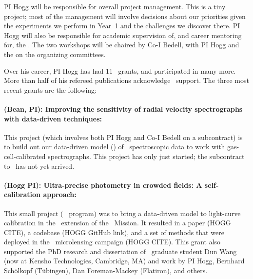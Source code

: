 \documentclass[12pt, letterpaper]{article}
\begin{document}
PI Hogg will be responsible for overall project management. This is a
tiny project; most of the management will involve decisions about our
priorities given the experiments we perform in Year~1 and the
challenges we discover there.
PI Hogg will also be responsible for academic supervision of, and
career mentoring for, the \GRA.
The two workshops will be chaired by Co-I Bedell, with PI Hogg and
the \GRA on the organizing committees.


Over his career, PI Hogg has had 11 \NASA\ grants, and participated in
many more.
More than half of his refereed publications acknowledge \NASA\ support.
The three most recent grants are the following:

\paragraph{ (Bean, PI):
Improving the sensitivity of radial velocity spectrographs with data-driven techniques:}
This project (which involves both PI Hogg and Co-I Bedell on a subcontract)
is to
build out our data-driven model (\wobble) of \EPRV\ spectroscopic data
to work with gas-cell-calibrated spectrographs. This project has only
just started; the subcontract to \NYU\ has not yet arrived.

\paragraph{ (Hogg PI):
Ultra-precise photometry in crowded fields: A self-calibration approach:}
This small project (\Ktwo\  program)
was to bring a data-driven model to light-curve calibration
in the \Ktwo\ extension of the \Kepler\ Mission.
It resulted in a paper (HOGG CITE), a codebase (HOGG GitHub link),
and a set of methods that were deployed in the \Ktwo\ microlensing campaign (HOGG CITE).
This grant also supported the PhD research and dissertation of \NYU\ graduate
student Dun Wang (now at Kensho Technologies, Cambridge, MA) and work
by PI Hogg, Bernhard Sch\"olkopf (T\"ubingen), Dan Foreman-Mackey
(Flatiron), and others.
\end{document}
